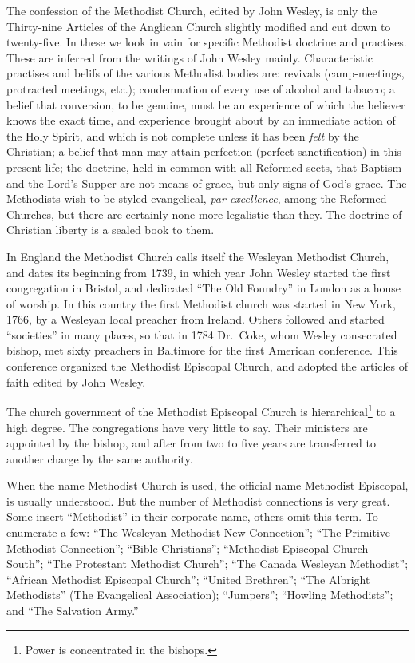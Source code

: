 \documentclass[
]{book}
\begin{document}
The confession of the Methodist Church, edited by John Wesley, is only the Thirty-nine Articles of the Anglican Church slightly modified and cut down to twenty-five. In these we look in vain for specific Methodist doctrine and practises. These are inferred from the writings of John Wesley mainly. Characteristic practises and belifs of the various Methodist bodies are: revivals (camp-meetings, protracted meetings, etc.); condemnation of every use of alcohol and tobacco; a belief that conversion, to be genuine, must be an experience of which the believer knows the exact time, and experience brought about by an immediate action of the Holy Spirit, and which is not complete unless it has been \emph{felt} by the Christian; a belief that man may attain perfection (perfect sanctification) in this present life; the doctrine, held in common with all Reformed sects, that Baptism and the Lord's Supper are not means of grace, but only signs of God's grace. The Methodists wish to be styled evangelical, \emph{par excellence}, among the Reformed Churches, but there are certainly none more legalistic than they. The doctrine of Christian liberty is a sealed book to them.

In England the Methodist Church calls itself the Wesleyan Methodist Church, and dates its beginning from 1739, in which year John Wesley started the first congregation in Bristol, and dedicated ``The Old Foundry'' in London as a house of worship. In this country the first Methodist church was started in New York, 1766, by a Wesleyan local preacher from Ireland. Others followed and started ``societies'' in many places, so that in 1784 Dr.~Coke, whom Wesley consecrated bishop, met sixty preachers in Baltimore for the first American conference. This conference organized the Methodist Episcopal Church, and adopted the articles of faith edited by John Wesley.

The church government of the Methodist Episcopal Church is hierarchical\footnote{Power is concentrated in the bishops.} to a high degree. The congregations have very little to say. Their ministers are appointed by the bishop, and after from two to five years are transferred to another charge by the same authority.

When the name Methodist Church is used, the official name Methodist Episcopal, is usually understood. But the number of Methodist connections is very great. Some insert ``Methodist'' in their corporate name, others omit this term. To enumerate a few: ``The Wesleyan Methodist New Connection''; ``The Primitive Methodist Connection''; ``Bible Christians''; ``Methodist Episcopal Church South''; ``The Protestant Methodist Church''; ``The Canada Wesleyan Methodist''; ``African Methodist Episcopal Church''; ``United Brethren''; ``The Albright Methodists'' (The Evangelical Association); ``Jumpers''; ``Howling Methodists''; and ``The Salvation Army.''
\end{document}
